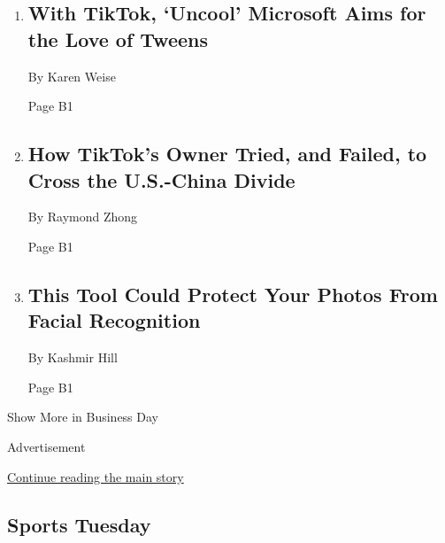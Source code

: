 \begin{enumerate}
\def\labelenumi{\arabic{enumi}.}
\item
  \href{/2020/08/03/technology/tiktok-microsoft-tweens.html}{}

  \hypertarget{with-tiktok-uncool-microsoft-aims-for-the-love-of-tweens}{%
  \subsection{With TikTok, `Uncool' Microsoft Aims for the Love of
  Tweens}\label{with-tiktok-uncool-microsoft-aims-for-the-love-of-tweens}}

  By Karen Weise

  Page B1
\item
  \href{/2020/08/03/technology/tiktok-bytedance-us-china.html}{}

  \hypertarget{how-tiktoks-owner-tried-and-failed-to-cross-the-us-china-divide}{%
  \subsection{How TikTok's Owner Tried, and Failed, to Cross the
  U.S.-China
  Divide}\label{how-tiktoks-owner-tried-and-failed-to-cross-the-us-china-divide}}

  By Raymond Zhong

  Page B1
\item
  \href{/2020/08/03/technology/fawkes-tool-protects-photos-from-facial-recognition.html}{}

  \hypertarget{this-tool-could-protect-your-photos-from-facial-recognition-1}{%
  \subsection{This Tool Could Protect Your Photos From Facial
  Recognition}\label{this-tool-could-protect-your-photos-from-facial-recognition-1}}

  By Kashmir Hill

  Page B1
\end{enumerate}

Show More in Business Day

Advertisement

\protect\hyperlink{after-mid4}{Continue reading the main story}

\hypertarget{sports-tuesday}{%
\subsection{Sports Tuesday}\label{sports-tuesday}}

